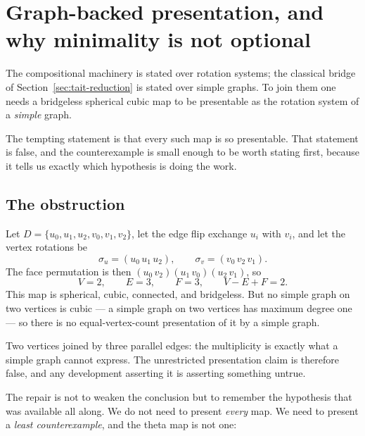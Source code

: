 %

\section{Graph-backed presentation, and why minimality is not optional}
\label{sec:graph-backed}

The compositional machinery is stated over rotation systems; the classical
bridge of Section~\ref{sec:tait-reduction} is stated over simple graphs. To
join them one needs a bridgeless spherical cubic map to be presentable as
the rotation system of a \emph{simple} graph.

The tempting statement is that every such map is so presentable. That
statement is false, and the counterexample is small enough to be worth
stating first, because it tells us exactly which hypothesis is doing the
work.

\subsection{The obstruction}

\begin{example}\label{ex:theta}
\Sprose
Let $D = \{u_0, u_1, u_2, v_0, v_1, v_2\}$, let the edge flip exchange $u_i$
with $v_i$, and let the vertex rotations be
\[
  \sigma_u = (u_0\,u_1\,u_2), \qquad \sigma_v = (v_0\,v_2\,v_1).
\]
The face permutation is then $(u_0\,v_2)(u_1\,v_0)(u_2\,v_1)$, so
\[
  V = 2, \qquad E = 3, \qquad F = 3, \qquad V - E + F = 2 .
\]
This map is spherical, cubic, connected, and bridgeless. But no simple
graph on two vertices is cubic --- a simple graph on two vertices has
maximum degree one --- so there is no equal-vertex-count presentation of it
by a simple graph.
\end{example}

Two vertices joined by three parallel edges: the multiplicity is exactly
what a simple graph cannot express. The unrestricted presentation claim is
therefore false, and any development asserting it is asserting something
untrue.

The repair is not to weaken the conclusion but to remember the hypothesis
that was available all along. We do not need to present \emph{every} map. We
need to present a \emph{least counterexample}, and the theta map is not one:

